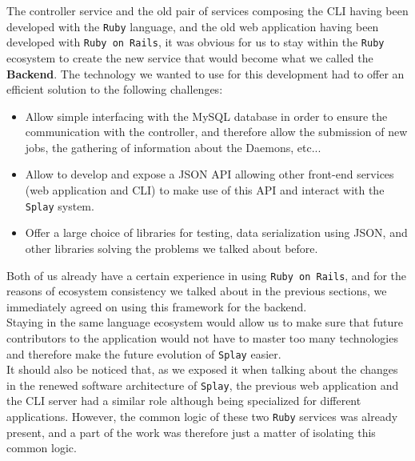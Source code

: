 \documentclass{eplmastersthesis}
\begin{document}
        The controller service and the old pair of services composing the CLI
        having been developed with the \texttt{Ruby} language, and the old web
        application having been developed with \texttt{Ruby on Rails}, it was obvious
        for us to stay within the \texttt{Ruby} ecosystem to create the new service
        that would become what we called the \textbf{Backend}. The technology
        we wanted to use for this development had to offer an efficient
        solution to the following challenges:

        \begin{itemize}
          \item Allow simple interfacing with the MySQL database in order
          to ensure the communication with the controller, and therefore allow
          the submission of new jobs, the gathering of information about the
          Daemons, etc...
          \item Allow to develop and expose a JSON API allowing other front-end
          services (web application and CLI) to make use of this API and
          interact with the \texttt{Splay} system.
          \item Offer a large choice of libraries for testing, data
          serialization using JSON, and other libraries solving the problems
          we talked about before.
        \end{itemize}

        Both of us already have a certain experience in using \texttt{Ruby on
        Rails}, and for the reasons of ecosystem consistency we talked about
        in the previous sections, we immediately agreed on using this
        framework for the backend.\\
        Staying in the same language ecosystem would allow us to make sure
        that future contributors to the application would not have to master
        too many technologies and therefore make the future evolution
        of \texttt{Splay} easier.\\

        It should also be noticed that, as we exposed it when talking about the
        changes in the renewed software architecture of \texttt{Splay}, the previous
        web application and the CLI server had a similar role although being
        specialized for different applications. However, the common logic
        of these two \texttt{Ruby} services was already present, and a part of the
        work was therefore just a matter of isolating this common logic.\\
\end{document}

